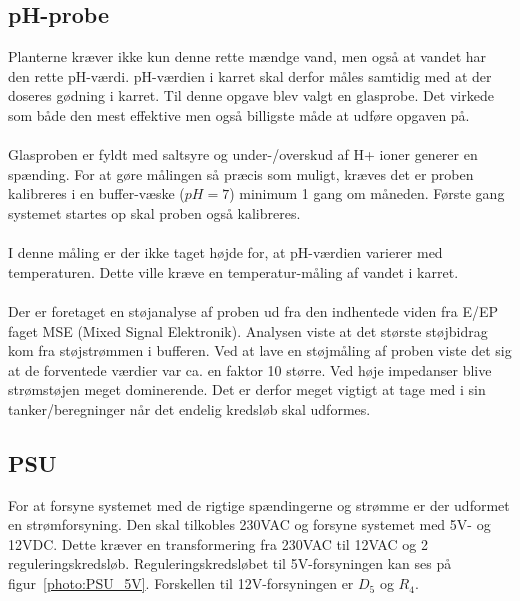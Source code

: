 \subsection{pH-probe}
Planterne kræver ikke kun denne rette mændge vand, men også at vandet har den rette pH-værdi. pH-værdien i karret skal derfor måles samtidig med at der doseres gødning i karret. Til denne opgave blev valgt en glasprobe. Det virkede som både den mest effektive men også billigste måde at udføre opgaven på.
\\\\
Glasproben er fyldt med saltsyre og under-/overskud af H+ ioner generer en spænding. For at gøre målingen så præcis som muligt, kræves det er proben kalibreres i en buffer-væske ($pH = 7$) minimum 1 gang om måneden. Første gang systemet startes op skal proben også kalibreres. 
\\\\
I denne måling er der ikke taget højde for, at pH-værdien varierer med temperaturen. Dette ville kræve en temperatur-måling af vandet i karret.
\\\\
Der er foretaget en støjanalyse af proben ud fra den indhentede viden fra E/EP faget MSE (Mixed Signal Elektronik). Analysen viste at det største støjbidrag kom fra støjstrømmen i bufferen. Ved at lave en støjmåling af proben viste det sig at de forventede værdier var ca. en faktor 10 større. Ved høje impedanser blive strømstøjen meget dominerende. Det er derfor meget vigtigt at tage med i sin tanker/beregninger når det endelig kredsløb skal udformes.

\subsection{PSU}
For at forsyne systemet med de rigtige spændingerne og strømme er der udformet en strømforsyning. Den skal tilkobles 230VAC og forsyne systemet med 5V- og 12VDC. Dette kræver en transformering fra 230VAC til 12VAC og 2 reguleringskredsløb. Reguleringskredsløbet til 5V-forsyningen kan ses på figur~\ref{photo:PSU_5V}. Forskellen til 12V-forsyningen er $D_5$ og $R_4$.
 

